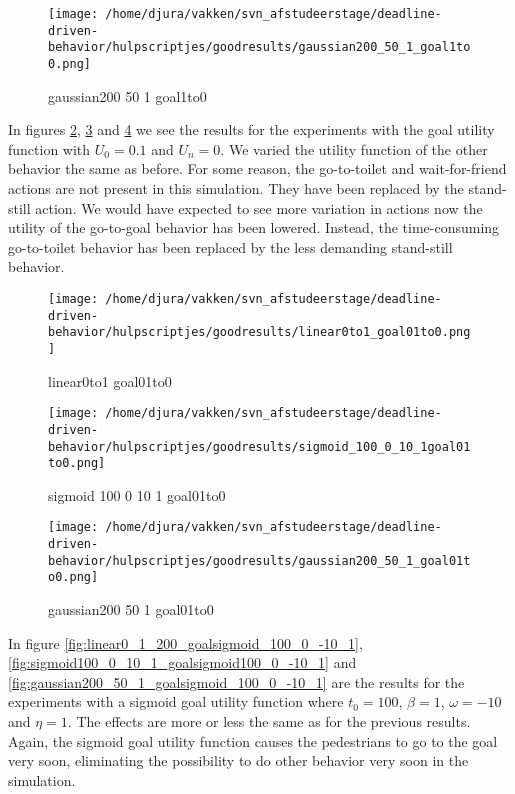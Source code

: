 \documentclass[11pt]{book}
\begin{document}
\begin{figure}[b]
\texttt{[image: /home/djura/vakken/svn\_afstudeerstage/deadline-driven-behavior/hulpscriptjes/goodresults/gaussian200\_50\_1\_goal1to0.png]}
\caption{gaussian200 50 1 goal1to0}
\label{fig:gaussian200_50_1_goal1to0}
\end{figure}



In figures \ref{fig:linear0to1_goal01to0}, \ref{fig:sigmoid_100_0_10_1goal01to0} and \ref{fig:gaussian200_50_1_goal01to0} we see the results for the experiments with the goal utility function with $U_0=0.1$ and $U_n=0$. We varied the utility function of the other behavior the same as before. For some reason, the go-to-toilet and wait-for-friend actions are not present in this simulation. They have been replaced by the stand-still action. We would have expected to see more variation in actions now the utility of the go-to-goal behavior has been lowered. Instead, the time-consuming go-to-toilet behavior has been replaced by the less demanding stand-still behavior.

\begin{figure}
\centering
\texttt{[image: /home/djura/vakken/svn\_afstudeerstage/deadline-driven-behavior/hulpscriptjes/goodresults/linear0to1\_goal01to0.png]}
\caption{linear0to1 goal01to0}
\label{fig:linear0to1_goal01to0}
\end{figure}

\begin{figure}
\centering
\texttt{[image: /home/djura/vakken/svn\_afstudeerstage/deadline-driven-behavior/hulpscriptjes/goodresults/sigmoid\_100\_0\_10\_1goal01to0.png]}
\caption{sigmoid 100 0 10 1 goal01to0}
\label{fig:sigmoid_100_0_10_1goal01to0}
\end{figure}

\begin{figure}
\centering
\texttt{[image: /home/djura/vakken/svn\_afstudeerstage/deadline-driven-behavior/hulpscriptjes/goodresults/gaussian200\_50\_1\_goal01to0.png]}
\caption{gaussian200 50 1 goal01to0}
\label{fig:gaussian200_50_1_goal01to0}
\end{figure}


In figure \ref{fig:linear0_1_200_goalsigmoid_100_0_-10_1}, \ref{fig:sigmoid100_0_10_1_goalsigmoid100_0_-10_1} and \ref{fig:gaussian200_50_1_goalsigmoid_100_0_-10_1} are the results for the experiments with a sigmoid goal utility function where $t_0=100$, $\beta=1$, $\omega=-10$ and $\eta=1$. The effects are more or less the same as for the previous results. Again, the sigmoid goal utility function causes the pedestrians to go to the goal very soon, eliminating the possibility to do other behavior very soon in the simulation.
\end{document}
